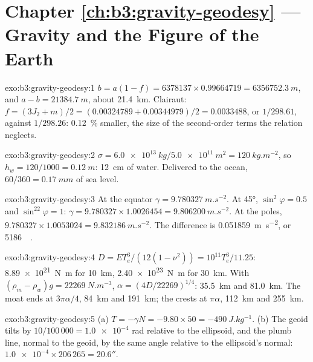 \section*{Chapter \ref{ch:b3:gravity-geodesy} --- Gravity and the Figure of the Earth}

\begin{solution}{exo:b3:gravity-geodesy:1}
$b = a(1 - f) = 6378137\times0.99664719 = \qty{6356752.3}{m}$, and
$a - b = \qty{21384.7}{m}$, about \qty{21.4}{km}. Clairaut:
$f = (3J_2 + m)/2 = (0.00324789 + 0.00344979)/2 = \num{0.0033488}$, or
$1/298.61$, against $1/298.26$: \qty{0.12}{\percent} smaller, the size of the
second-order terms the relation neglects.
\end{solution}

\begin{solution}{exo:b3:gravity-geodesy:2}
$\sigma = \qty{6.0e13}{kg}/\qty{5.0e11}{m^2} = \qty{120}{kg.m^{-2}}$, so
$h_w = 120/1000 = \qty{0.12}{m}$: \qty{12}{cm} of water. Delivered to the
ocean, $60/360 = \qty{0.17}{mm}$ of sea level.
\end{solution}

\begin{solution}{exo:b3:gravity-geodesy:3}
At the equator $\gamma = \qty{9.780327}{m.s^{-2}}$. At \ang{45},
$\sin^2\varphi = 0.5$ and $\sin^22\varphi = 1$: $\gamma = 9.780327\times1.0026454
= \qty{9.806200}{m.s^{-2}}$. At the poles, $9.780327\times1.0053024 =
\qty{9.832186}{m.s^{-2}}$. The difference is \qty{0.051859}{m.s^{-2}}, or
\qty{5186}{\milli\gal}.
\end{solution}

\begin{solution}{exo:b3:gravity-geodesy:4}
$D = ET_e^3/(12(1 - \nu^2)) = 10^{11}T_e^3/11.25$: \qty{8.89e21}{N.m} for
\qty{10}{km}, \qty{2.40e23}{N.m} for \qty{30}{km}. With $(\rho_m - \rho_w)g =
\qty{22269}{N.m^{-3}}$, $\alpha = (4D/22269)^{1/4}$: \qty{35.5}{km} and
\qty{81.0}{km}. The moat ends at $3\pi\alpha/4$, \qty{84}{km} and \qty{191}{km};
the  crests at $\pi\alpha$, \qty{112}{km} and \qty{255}{km}.
\end{solution}

\begin{solution}{exo:b3:gravity-geodesy:5}
(a) $T = -\gamma N = -9.80\times50 = \qty{-490}{J.kg^{-1}}$. (b) The geoid tilts
by $10/100\,000 = \num{1.0e-4}$ rad relative to the ellipsoid, and the plumb
line, normal to the geoid, by the same angle relative to the ellipsoid's normal:
$\num{1.0e-4}\times206\,265 = 20.6''$.
\end{solution}

